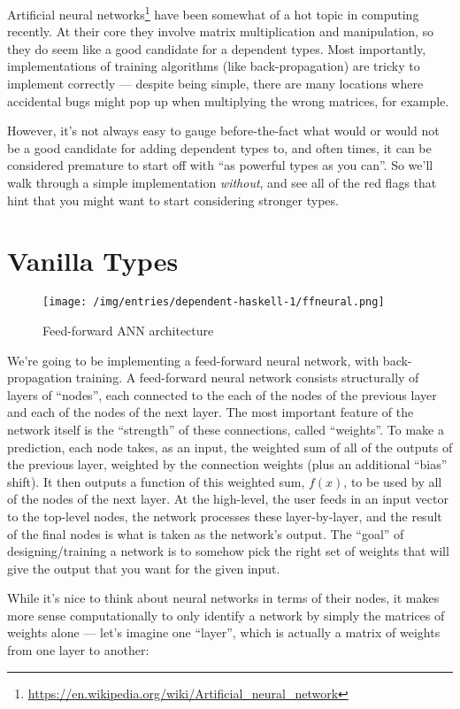 \documentclass[]{article}
\renewcommand{\href}[2]{#2\footnote{\url{#1}}}
\begin{document}
\href{https://en.wikipedia.org/wiki/Artificial_neural_network}{Artificial
neural networks} have been somewhat of a hot topic in computing
recently. At their core they involve matrix multiplication and
manipulation, so they do seem like a good candidate for a dependent
types. Most importantly, implementations of training algorithms (like
back-propagation) are tricky to implement correctly --- despite being
simple, there are many locations where accidental bugs might pop up when
multiplying the wrong matrices, for example.

However, it's not always easy to gauge before-the-fact what would or
would not be a good candidate for adding dependent types to, and often
times, it can be considered premature to start off with ``as powerful
types as you can''. So we'll walk through a simple implementation
\emph{without}, and see all of the red flags that hint that you might
want to start considering stronger types.

\section{Vanilla Types}\label{vanilla-types}

\begin{figure}[htbp]
\centering
\texttt{[image: /img/entries/dependent-haskell-1/ffneural.png]}
\caption{Feed-forward ANN architecture}
\end{figure}

We're going to be implementing a feed-forward neural network, with
back-propagation training. A feed-forward neural network consists
structurally of layers of ``nodes'', each connected to the each of the
nodes of the previous layer and each of the nodes of the next layer. The
most important feature of the network itself is the ``strength'' of
these connections, called ``weights''. To make a prediction, each node
takes, as an input, the weighted sum of all of the outputs of the
previous layer, weighted by the connection weights (plus an additional
``bias'' shift). It then outputs a function of this weighted sum,
\(f(x)\), to be used by all of the nodes of the next layer. At the
high-level, the user feeds in an input vector to the top-level nodes,
the network processes these layer-by-layer, and the result of the final
nodes is what is taken as the network's output. The ``goal'' of
designing/training a network is to somehow pick the right set of weights
that will give the output that you want for the given input.

While it's nice to think about neural networks in terms of their nodes,
it makes more sense computationally to only identify a network by simply
the matrices of weights alone --- let's imagine one ``layer'', which is
actually a matrix of weights from one layer to another:
\end{document}
